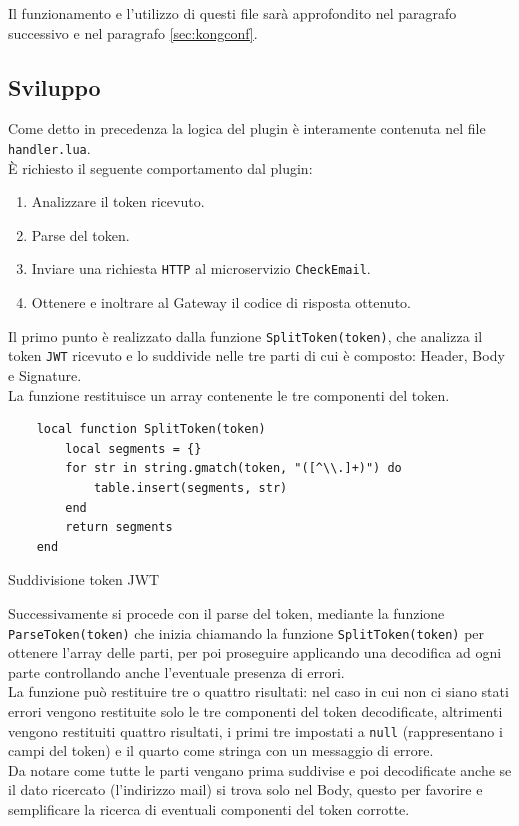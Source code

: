 Il funzionamento e l'utilizzo di questi file sarà approfondito nel paragrafo successivo e nel paragrafo \ref{sec:kongconf}.

\subsection{Sviluppo}\label{sec:sviluppoplugin}
Come detto in precedenza la logica del plugin è interamente contenuta nel file \texttt{handler.lua}.\\ 
È richiesto il seguente comportamento dal plugin:

\begin{enumerate}
	\item Analizzare il token ricevuto.
	\item Parse del token.
	\item Inviare una richiesta \texttt{HTTP} al microservizio \texttt{CheckEmail}.
	\item Ottenere e inoltrare al Gateway il codice di risposta ottenuto.
\end{enumerate}

Il primo punto è realizzato dalla funzione \texttt{SplitToken(token)}, che analizza il token \texttt{JWT} ricevuto e lo suddivide nelle tre parti di cui è composto: Header, Body e Signature.\\
La funzione restituisce un array contenente le tre componenti del token.

\begin{algorithm}
\centering
\begin{verbatim}
	local function SplitToken(token)
		local segments = {}
		for str in string.gmatch(token, "([^\\.]+)") do
			table.insert(segments, str)
		end
		return segments
	end
\end{verbatim}
\caption{Suddivisione token JWT}\label{alg:splittoken}
\end{algorithm}

Successivamente si procede con il parse del token, mediante la funzione \texttt{ParseToken(token)} che inizia chiamando la funzione \texttt{SplitToken(token)}
per ottenere l'array delle parti, per poi proseguire applicando una decodifica ad ogni parte controllando anche l'eventuale presenza di errori.\\
La funzione può restituire tre o quattro risultati: nel caso in cui non ci siano stati errori  vengono restituite solo le tre componenti del token decodificate, altrimenti 
vengono restituiti quattro risultati, i primi tre impostati a \texttt{null}
(rappresentano i campi del token) e il quarto come stringa con un messaggio di errore.\\
Da notare come tutte le parti vengano prima suddivise e poi decodificate anche se il dato ricercato (l'indirizzo mail) si trova solo nel Body, questo per favorire e semplificare 
la ricerca di eventuali componenti del token corrotte.

